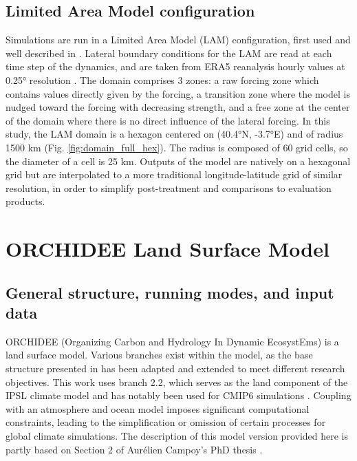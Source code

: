 \subsection{Limited Area Model configuration}
Simulations are run in a Limited Area Model (LAM) configuration, first used and well described in \cite{raillard_leveraging_2024}.
Lateral boundary conditions for the LAM are read at each time step of the dynamics, and are taken from ERA5 reanalysis hourly values at 0.25° resolution \citep{hersbach_era5_2020}.
The domain comprises 3 zones: a raw forcing zone which contains values directly given by the forcing, a transition zone  where the model is nudged toward the forcing with decreasing strength, and a free zone at the center of the domain where there is no direct influence of the lateral forcing.
In this study, the LAM domain is a hexagon centered on (40.4°N, -3.7°E) and of radius 1500 km (Fig. \ref{fig:domain_full_hex}). The radius is composed of 60 grid cells, so the diameter of a cell is 25 km. 
Outputs of the model are natively on a hexagonal grid but are interpolated to a more traditional longitude-latitude grid of similar resolution, in order to simplify post-treatment and comparisons to evaluation products.

\section{ORCHIDEE Land Surface Model}
\subsection{General structure, running modes, and input data}
ORCHIDEE (Organizing Carbon and Hydrology In Dynamic EcosystEms) is a land surface model. Various branches exist within the model, as the base structure presented in \cite{krinner_dynamic_2005} has been adapted and extended to meet different research objectives.
This work uses branch 2.2, which serves as the land component of the IPSL climate model and has notably been used for CMIP6 simulations \cite{boucher_presentation_2020}. Coupling with an atmosphere and ocean model imposes significant computational constraints, leading to the simplification or omission of certain processes for global climate simulations.
The description of this model version provided here is partly based on Section 2 of Aurélien Campoy’s PhD thesis \cite{campoy_influence_2013}.

